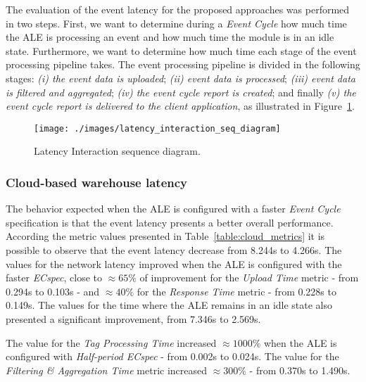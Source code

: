 The evaluation of the event latency for the proposed approaches was performed in two steps. First,
we want to determine during a \textit{Event Cycle} how much time the \gls{ALE} is processing an event
and how much time the module is in an idle state. Furthermore, we want to determine how much time
each stage of the event processing pipeline takes. The event processing pipeline is divided in the
following stages: \textit{(i) the event data is uploaded}; \textit{(ii) event data is processed};
\textit{(iii) event data is filtered and aggregated}; \textit{(iv) the event cycle report is created};
and finally \textit{(v) the event cycle report is delivered to the client application}, as
illustrated in Figure~\ref{fig:latency_seq_diagram}.

\begin{figure}[ht!]
  \centering
  \texttt{[image: ./images/latency\_interaction\_seq\_diagram]}
  \caption[Latency Interaction sequence diagram.]{Latency Interaction sequence diagram.}
  \label{fig:latency_seq_diagram}
\end{figure}

\subsubsection{Cloud-based warehouse latency}
\label{subs:eval_exp_latency_ecspec_fast}
The behavior expected when the \gls{ALE} is configured with a faster \textit{Event Cycle} specification
is that the event latency presents a better overall performance. According the metric values presented
in Table~\ref{table:cloud_metrics} it is possible to observe that the event latency decrease from 8.244s
to 4.266s. The values for the network latency improved when the \gls{ALE} is configured with the faster
\textit{ECspec}, close to $\approx65\%$ of improvement for the \textit{Upload Time} metric - from 0.294s
to 0.103s - and $\approx40\%$ for the \textit{Response Time} metric - from 0.228s to 0.149s. The
values for the time where the \gls{ALE} remains in an idle state also presented a significant
improvement, from 7.346s to 2.569s.



The value for the \textit{Tag Processing Time} increased $\approx1000\%$ when the \gls{ALE} is configured
with \textit{Half-period ECspec} - from 0.002s to 0.024s. The value for the \textit{Filtering \& Aggregation Time}
metric increased $\approx300\%$ - from 0.370s to 1.490s.

